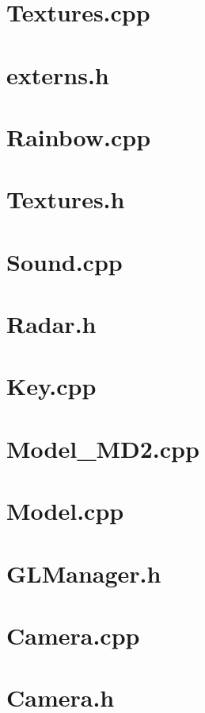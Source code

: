 \section{Textures.cpp}

\pagebreak
\section{externs.h}

\pagebreak
\section{Rainbow.cpp}

\pagebreak
\section{Textures.h}

\pagebreak
\section{Sound.cpp}

\pagebreak
\section{Radar.h}

\pagebreak
\section{Key.cpp}

\pagebreak
\section{Model\_MD2.cpp}

\pagebreak
\section{Model.cpp}

\pagebreak
\section{GLManager.h}

\pagebreak
\section{Camera.cpp}

\pagebreak
\section{Camera.h}

\pagebreak
